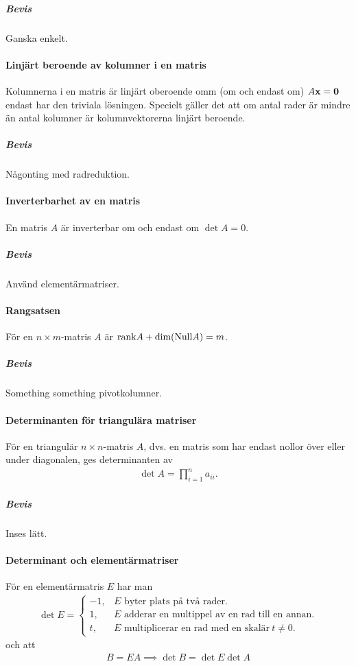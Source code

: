 \subparagraph{Bevis}
Ganska enkelt.

\paragraph{Linjärt beroende av kolumner i en matris}
Kolumnerna i en matris är linjärt oberoende omm (om och endast om) $A\vect{x} = \vect{0}$ endast har den triviala lösningen. Specielt gäller det att om antal rader är mindre än antal kolumner är kolumnvektorerna linjärt beroende.

\subparagraph{Bevis}
Någonting med radreduktion.

\paragraph{Inverterbarhet av en matris}
En matris $A$ är inverterbar om och endast om $\det A = 0$.

\subparagraph{Bevis}
Använd elementärmatriser.

\paragraph{Rangsatsen}
För en $n\times m$-matris $A$ är $\text{rank} A + \text{dim}(\text{Null} A) = m$.

\subparagraph{Bevis}
Something something pivotkolumner.

\paragraph{Determinanten för triangulära matriser}
För en triangulär $n\times n$-matris $A$, dvs. en matris som har endast nollor över eller under diagonalen, ges determinanten av
\begin{align*}
	\det{A} = \prod\limits_{i = 1}^{n} a_{ii}.
\end{align*}

\subparagraph{Bevis}
Inses lätt.

\paragraph{Determinant och elementärmatriser}
För en elementärmatris $E$ har man
\begin{align*}
	\det{E} =
	\begin{cases}
		-1, &E\text{ byter plats på två rader.} \\
		1,  &E\text{ adderar en multippel av en rad till en annan.} \\
		t,  &E\text{ multiplicerar en rad med en skalär}~t\neq 0.
	\end{cases}
\end{align*}
och att
\begin{align*}
	B = EA \implies \det{B} = \det{E}\det{A}
\end{align*}

